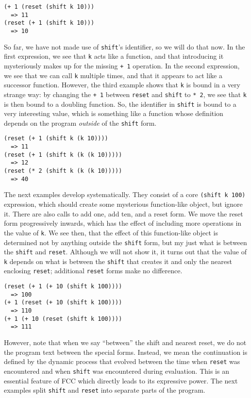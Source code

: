 \documentclass[11pt]{article}
\begin{document}
\begin{verbatim}
(+ 1 (reset (shift k 10)))
  => 11
(reset (+ 1 (shift k 10)))
  => 10
\end{verbatim}

So far, we have not made use of \texttt{shift}'s identifier, so we will do that now.
In the first expression, we see that \texttt{k} acts like a function, and that introducing it mysteriously makes up for the missing \texttt{+ 1} operation.
In the second expression, we see that we can call \texttt{k} multiple times, and that it appears to act like a successor function.
However, the third example shows that \texttt{k} is bound in a very strange way:
by changing the \texttt{+ 1} between \texttt{reset} and \texttt{shift} to \texttt{* 2}, we see that \texttt{k} is then bound to a doubling function.
So, the identifier in \texttt{shift} is bound to a very interesting value, which is something like a function whose definition depends on the program \emph{outside} of the \texttt{shift} form.

\begin{verbatim}
(reset (+ 1 (shift k (k 10))))
  => 11
(reset (+ 1 (shift k (k (k 10)))))
  => 12
(reset (* 2 (shift k (k (k 10)))))
  => 40
\end{verbatim}

The next examples develop systematically.
They consist of a core \texttt{(shift k 100)} expression, which should create some mysterious function-like object, but ignore it.
There are also calls to add one, add ten, and a reset form.
We move the reset form progressively inwards, which has the effect of including more operations in the value of \texttt{k}.
We see then, that the effect of this function-like object is determined not by anything outside the \texttt{shift} form, but my just what is between the \texttt{shift} and \texttt{reset}.
Although we will not show it, it turns out that the value of \texttt{k} depends on what is between the \texttt{shift} that creates it and only the nearest enclosing \texttt{reset}; additional \texttt{reset} forms make no difference.

\begin{verbatim}
(reset (+ 1 (+ 10 (shift k 100))))
  => 100
(+ 1 (reset (+ 10 (shift k 100))))
  => 110
(+ 1 (+ 10 (reset (shift k 100))))
  => 111
\end{verbatim}

However, note that when we say ``between'' the shift and nearest reset, we do not the program text between the special forms.
Instead, we mean the continuation is defined by the dynamic process that evolved between the time when \texttt{reset} was encountered and when \texttt{shift} was encountered during evaluation.
This is an essential feature of FCC which directly leads to its expressive power.
The next examples split \texttt{shift} and \texttt{reset} into separate parts of the program.
\end{document}
